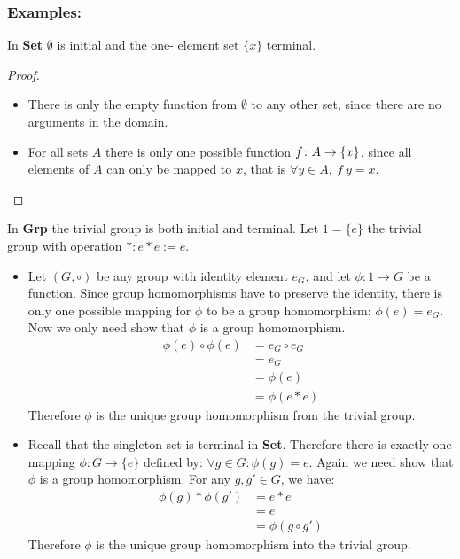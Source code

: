 \subsubsection {Examples:}
In \textbf{Set} $\emptyset$ is initial and the one- element set $\{x\}$ terminal.
\begin{proof}
  \ \\
\begin {itemize}
\item There is only the empty function from $\emptyset$ to any other set, since there are no arguments in the domain.
\item For all sets $A$ there is only one possible function $f \from A \to \{x\}$, since all elements of $A$ can only be mapped
  to $x$, that is $\forall y \in A,\ f \ y = x$.
\end{itemize}
\end{proof}
In \textbf{Grp} the trivial group is both initial and terminal.
Let $1=\{e\}$ the trivial group with operation $*: e*e := e$.
\begin {itemize}
\item Let $\left({G, \circ}\right)$ be any group with identity element $e_G$,
  and let $\phi: 1 \to G$ be a function.
  Since group homomorphisms have to preserve the identity,
  there is only one possible mapping for $\phi$ to be a group homomorphism:
  $\phi (e) = e_G$.\\
  Now we only need show that $\phi$ is a group homomorphism.
  \begin{align*}
    \phi (e) \circ \phi (e) &= e_G \circ e_G \\
                            &= e_G \\
                            &= \phi (e) \\
                            &= \phi (e * e)
  \end{align*}
  Therefore $\phi$ is the unique group homomorphism from the trivial group.
\item Recall that the singleton set is terminal in \textbf{Set}.
  Therefore there is exactly one mapping
  $\phi: G \to \{e\}$ defined by:
  $\forall g \in G: \phi(g) = e$.
  Again we need show that $\phi$ is a group homomorphism.
  For any $g, g' \in G$, we have:
  \begin{align*}
    \phi(g)*\phi(g') &= e * e \\
    &= e \\
    &= \phi (g \circ g')
  \end{align*}
  Therefore $\phi$ is the unique group homomorphism into the trivial group.
\end{itemize}
